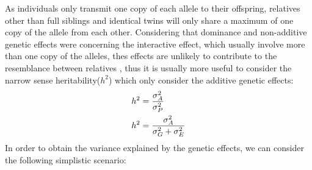 \documentclass{book}
\begin{document}
	As individuals only transmit one copy of each allele to their offspring, relatives other than full siblings and identical twins will only share a maximum of one copy of the allele from each other.
	Considering that dominance and non-additive genetic effects were concerning the interactive effect, which usually involve more than one copy of the alleles, thes effects are unlikely to contribute to the resemblance between relatives \citep{Visscher2008}, thus it is usually more useful to consider the narrow sense heritability($h^2$) which only consider the additive genetic effects:
	\begin{align}
	h^2&=\frac{\sigma_A^2}{\sigma_P^2} \notag\\
	h^2&=\frac{\sigma_A^2}{\sigma_G^2+\sigma_E^2}
	\label{eq:narrowHeritability}
	\end{align}
	In order to obtain the variance explained by the genetic effects, we can consider the following simplistic scenario:
	
\end{document}
